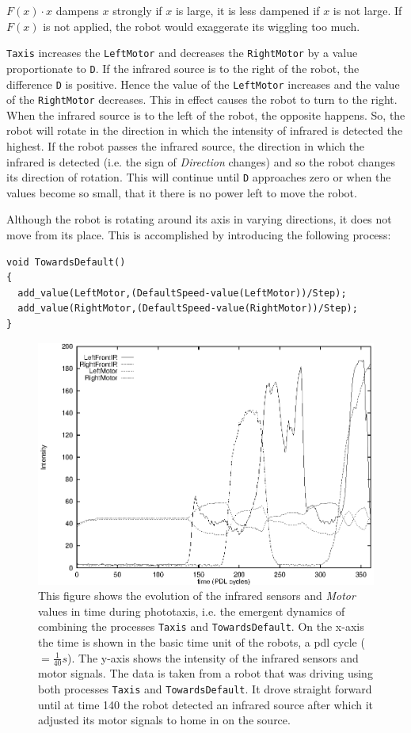 $F(x)\cdot x$ dampens $x$ strongly if $x$ is large, it is less dampened if $x$ is not large. If $F(x)$ is not applied, the robot would exaggerate its wiggling too much.


\texttt{Taxis} increases the \texttt{LeftMotor} and decreases the \texttt{RightMotor} by a value proportionate to \texttt{D}. If the infrared source is to the right of the robot, the difference \texttt{D} is positive. Hence the value of the \texttt{LeftMotor} increases and the value of the \texttt{RightMotor} decreases. This in effect causes the robot to turn to the right. When the infrared source is to the left of the robot, the opposite happens. So, the robot will rotate in the direction in which the intensity of infrared is detected the highest. If the robot passes the infrared source, the direction in which the infrared is detected (i.e. the sign of {\em Direction} changes) and so the robot changes its direction of rotation. This will continue until \texttt{D} approaches zero or when the values become so small, that it there is no power left to move the robot.

Although the robot is rotating around its axis in varying directions, it does not move from its place. This is accomplished by introducing the following process:


{\small\begin{verbatim}
void TowardsDefault()
{
  add_value(LeftMotor,(DefaultSpeed-value(LeftMotor))/Step);
  add_value(RightMotor,(DefaultSpeed-value(RightMotor))/Step);
}
\end{verbatim}}


\begin{figure}
\centerline{\includegraphics[width=12cm]{robots//irtaxis.eps}}
\caption{This figure shows the evolution of the infrared sensors and {\em Motor} values in time during phototaxis, i.e. the emergent dynamics of combining the processes \texttt{Taxis} and \texttt{TowardsDefault}. On the x-axis the time is shown in the basic time unit of the robots, a {\sc pdl} cycle ($= \frac{1}{40} s$). The y-axis shows the intensity of the infrared sensors and motor signals. The data is taken from a robot that was driving using both processes \texttt{Taxis} and \texttt{TowardsDefault}. It drove straight forward until at time 140 the robot detected an infrared source after which it adjusted its motor signals to home in on the source.}
\label{f:irtaxis}
\end{figure}



